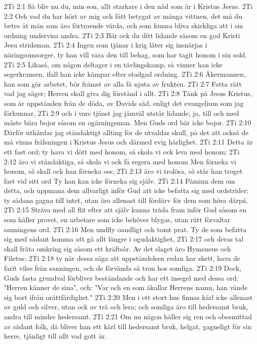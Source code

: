 2Ti 2:1  Så bliv nu du, min son, allt starkare i den nåd som är i Kristus Jesus.
2Ti 2:2  Och vad du har hört av mig och fått betygat av många vittnen, det må du betro åt män som äro förtroende värda, och som kunna bliva skickliga att i sin ordning undervisa andra.
2Ti 2:3  Bär ock du ditt lidande såsom en god Kristi Jesu stridsman.
2Ti 2:4  Ingen som tjänar i krig låter sig insnärjas i näringsomsorger, ty han vill vara den till behag, som har tagit honom i sin sold.
2Ti 2:5  Likaså, om någon deltager i en tävlingskamp, så vinner han icke segerkransen, ifall han icke kämpar efter stadgad ordning.
2Ti 2:6  Åkermannen, han som gör arbetet, bör främst av alla få njuta av frukten.
2Ti 2:7  Fatta rätt vad jag säger; Herren skall giva dig förstånd i allt.
2Ti 2:8  Tänk på Jesus Kristus, som är uppstånden från de döda, av Davids säd, enligt det evangelium som jag förkunnar,
2Ti 2:9  och i vars tjänst jag jämväl utstår lidande, ja, till och med måste bära bojor såsom en ogärningsman. Men Guds ord bär icke bojor.
2Ti 2:10  Därför uthärdar jag ståndaktigt allting för de utvaldas skull, på det att också de må vinna frälsningen i Kristus Jesus och därmed evig härlighet.
2Ti 2:11  Detta är ett fast ord; ty hava vi dött med honom, så skola vi ock leva med honom;
2Ti 2:12  äro vi ståndaktiga, så skola vi ock få regera med honom Men förneka vi honom, så skall ock han förneka oss;
2Ti 2:13  äro vi trolösa, så står han troget fast vid sitt ord Ty han kan icke förneka sig själv.
2Ti 2:14  Påminn dem om detta, och uppmana dem allvarligt inför Gud att icke befatta sig med ordstrider; ty sådana gagna till intet, utan äro allenast till fördärv för dem som höra därpå.
2Ti 2:15  Sträva med all flit efter att själv kunna träda fram inför Gud såsom en som håller provet, en arbetare som icke behöver blygas, utan rätt förvaltar sanningens ord.
2Ti 2:16  Men undfly oandligt och tomt prat. Ty de som befatta sig med sådant komma att gå allt längre i ogudaktighet,
2Ti 2:17  och deras tal skall fräta omkring sig såsom ett kräftsår. Av det slaget äro Hymeneus och Filetus;
2Ti 2:18  ty när dessa säga att uppståndelsen redan har skett, hava de farit vilse från sanningen, och de förvända så tron hos somliga.
2Ti 2:19  Dock, Guds fasta grundval förbliver beståndande och har ett insegel med dessa ord: "Herren känner de sina", och: "Var och en som åkallar Herrens namn, han vände sig bort ifrån orättfärdighet."
2Ti 2:20  Men i ett stort hus finnas kärl icke allenast av guld och silver, utan ock av trä och lera; och somliga äro till hedersamt bruk, andra till mindre hedersamt.
2Ti 2:21  Om nu någon håller sig ren och obesmittad av sådant folk, då bliver han ett kärl till hedersamt bruk, helgat, gagneligt för sin herre, tjänligt till allt vad gott är.
